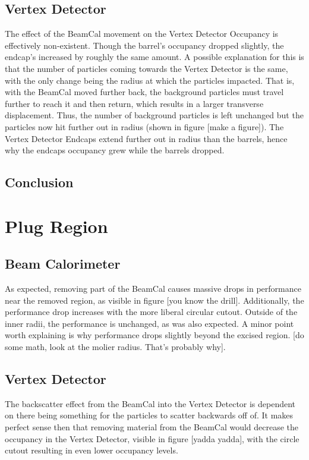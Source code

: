 \documentclass{report}
\begin{document}
            \subsection{Vertex Detector} 
                The effect of the BeamCal movement on the Vertex Detector Occupancy is effectively non-existent. Though the barrel's occupancy dropped slightly, the endcap's increased by roughly the same amount. A possible explanation for this is that the number of particles coming towards the Vertex Detector is the same, with the only change being the radius at which the particles impacted. That is, with the BeamCal moved further back, the background particles must travel further to reach it and then return, which results in a larger transverse displacement. Thus, the number of background particles is left unchanged but the particles now hit further out in radius (shown in figure [make a figure]). The Vertex Detector Endcaps extend further out in radius than the barrels, hence why the endcaps occupancy grew while the barrels dropped.

            \subsection{Conclusion}


        \section{Plug Region}
            \subsection{Beam Calorimeter}
                As expected, removing part of the BeamCal causes massive drops in performance near the removed region, as visible in figure [you know the drill]. Additionally, the performance drop increases with the more liberal circular cutout. Outside of the inner radii, the performance is unchanged, as was also expected. A minor point worth explaining is why performance drops slightly beyond the excised region. [do some math, look at the molier radius. That's probably why].
                
            \subsection{Vertex Detector} 
                The backscatter effect from the BeamCal into the Vertex Detector is dependent on there being something for the particles to scatter backwards off of. It makes perfect sense then that removing material from the BeamCal would decrease the occupancy in the Vertex Detector, visible in figure [yadda yadda], with the circle cutout resulting in even lower occupancy levels.
                
\end{document}
